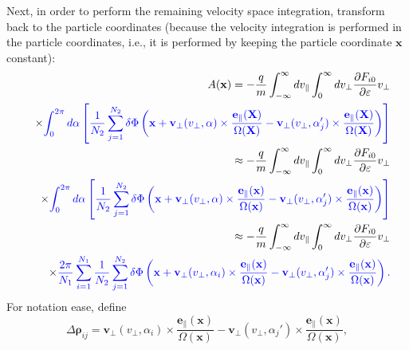 \documentclass{article}
\newcommand{\tmcolor}[2]{{\color{#1}{#2}}}
\begin{document}
Next, in order to perform the remaining velocity space integration, transform
back to the particle coordinates (because the velocity integration is
performed in the particle coordinates, i.e., it is performed by keeping the
particle coordinate $\mathbf{x}$ constant):
\begin{eqnarray}
  &  & A (\mathbf{x}) = - \frac{q}{m} \int_{- \infty}^{\infty} d
  v_{\parallel} \int_0^{\infty} d v_{\perp} \frac{\partial F_{i 0}}{\partial
  \varepsilon} v_{\perp} \nonumber\\
  &  & \times \tmcolor{blue}{\int_0^{2 \pi} d \alpha \left[ \frac{1}{N_2}
  \sum_{j = 1}^{N_2} \delta \Phi \left( \mathbf{x} +\mathbf{v}_{\perp}
  (v_{\perp}, \alpha) \times \frac{\mathbf{e}_{\parallel} (\mathbf{X})}{\Omega
  (\mathbf{X})} -\mathbf{v}_{\perp} (v_{\perp}, \alpha_j') \times
  \frac{\mathbf{e}_{\parallel} (\mathbf{X})}{\Omega (\mathbf{X})} \right)
  \right]} \nonumber\\
  &  & \approx - \frac{q}{m} \int_{- \infty}^{\infty} d v_{\parallel}
  \int_0^{\infty} d v_{\perp} \frac{\partial F_{i 0}}{\partial \varepsilon}
  v_{\perp} \nonumber\\
  &  & \times \tmcolor{blue}{\int_0^{2 \pi} d \alpha \left[ \frac{1}{N_2}
  \sum_{j = 1}^{N_2} \delta \Phi \left( \mathbf{x} +\mathbf{v}_{\perp}
  (v_{\perp}, \alpha) \times \frac{\mathbf{e}_{\parallel} (\mathbf{x})}{\Omega
  (\mathbf{x})} -\mathbf{v}_{\perp} (v_{\perp}, \alpha_j') \times
  \frac{\mathbf{e}_{\parallel} (\mathbf{x})}{\Omega (\mathbf{x})} \right)
  \right]} \nonumber\\
  &  & \approx - \frac{q}{m}  \int_{- \infty}^{\infty} d v_{\parallel}
  \int_0^{\infty} d v_{\perp} \frac{\partial F_{i 0}}{\partial \varepsilon}
  v_{\perp} \nonumber\\
  &  & \times \tmcolor{blue}{\frac{2 \pi}{N_1} \sum_{i = 1}^{N_1}
  \frac{1}{N_2}  \sum_{j = 1}^{N_2} \delta \Phi \left( \mathbf{x}
  +\mathbf{v}_{\perp} (v_{\perp}, \alpha_i) \times
  \frac{\mathbf{e}_{\parallel} (\mathbf{x})}{\Omega (\mathbf{x})}
  -\mathbf{v}_{\perp} (v_{\perp}, \alpha_j') \times
  \frac{\mathbf{e}_{\parallel} (\mathbf{x})}{\Omega (\mathbf{x})} \right) .} 
  \label{21-9-16-a4}
\end{eqnarray}
For notation ease, define
\begin{equation}
  \Delta \mathbf{\rho}_{i j} =\mathbf{v}_{\perp} (v_{\perp}, \alpha_i) \times
  \frac{\mathbf{e}_{\parallel} (\mathbf{x})}{\Omega (\mathbf{x})}
  -\mathbf{v}_{\perp} (v_{\perp}, \alpha_j') \times
  \frac{\mathbf{e}_{\parallel} (\mathbf{x})}{\Omega (\mathbf{x})},
\end{equation}
\end{document}
